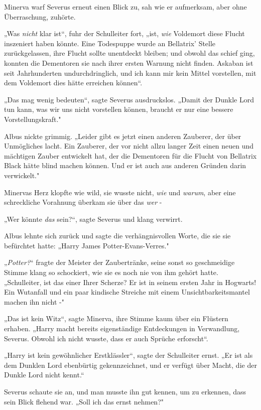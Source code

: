 {Minerva warf Severus erneut einen Blick zu, sah wie er aufmerksam, aber ohne Überraschung, zuhörte.

„Was \emph{nicht} klar ist“, fuhr der Schulleiter fort, „ist, \emph{wie} Voldemort diese Flucht inszeniert haben könnte. Eine Todespuppe wurde an Bellatrix' Stelle zurückgelassen, ihre Flucht sollte unentdeckt bleiben; und obwohl das schief ging, konnten die Dementoren sie nach ihrer ersten Warnung nicht finden. Askaban ist seit Jahrhunderten undurchdringlich, und ich kann mir kein Mittel vorstellen, mit dem Voldemort dies hätte erreichen können“.

„Das mag wenig bedeuten“, sagte Severus ausdruckslos. „Damit der Dunkle Lord tun kann, was wir uns nicht vorstellen können, braucht er nur eine bessere Vorstellungskraft."

Albus nickte grimmig. „Leider gibt es jetzt einen anderen Zauberer, der über Unmögliches lacht. Ein Zauberer, der vor nicht allzu langer Zeit einen neuen und mächtigen Zauber entwickelt hat, der die Dementoren für die Flucht von Bellatrix Black hätte blind machen können. Und er ist auch aus anderen Gründen darin verwickelt."

Minervas Herz klopfte wie wild, sie wusste nicht, \emph{wie} und \emph{warum}, aber eine schreckliche Vorahnung überkam sie über das \emph{wer} -

„Wer könnte \emph{das} sein?“, sagte Severus und klang verwirrt.

Albus lehnte sich zurück und sagte die verhängnisvollen Worte, die sie sie befürchtet hatte: „Harry James Potter-Evans-Verres."

„\emph{Potter?}“ fragte der Meister der Zaubertränke, seine sonst so geschmeidige Stimme klang so schockiert, wie sie es noch nie von ihm gehört hatte. „Schulleiter, ist das einer Ihrer Scherze? Er ist in seinem ersten Jahr in Hogwarts! Ein Wutanfall und ein paar kindische Streiche mit einem Unsichtbarkeitsmantel machen ihn nicht -"

„Das ist kein Witz“, sagte Minerva, ihre Stimme kaum über ein Flüstern erhaben. „Harry macht bereits eigenständige Entdeckungen in Verwandlung, Severus. Obwohl ich nicht wusste, dass er auch Sprüche erforscht“.

„Harry ist kein gewöhnlicher Erstklässler“, sagte der Schulleiter ernst. „Er ist als dem Dunklen Lord ebenbürtig gekennzeichnet, und er verfügt über Macht, die der Dunkle Lord nicht kennt.“

Severus schaute sie an, und man musste ihn gut kennen, um zu erkennen, dass sein Blick flehend war. „Soll ich das ernst nehmen?"

}

